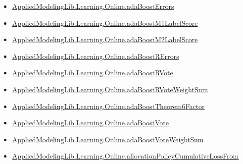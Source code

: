 \documentclass[10pt]{article}
\begin{document}
\begin{itemize}[leftmargin=1.2em]
\begin{itemize}[leftmargin=1.2em]
\item \hyperlink{library-prerequisite-ff1cefb5582d918e}{Applied\allowbreak{}Modeling\allowbreak{}Lib.\allowbreak{}Learning.\allowbreak{}Online.\allowbreak{}ada\allowbreak{}Boost\allowbreak{}Errors}
\item \hyperlink{library-prerequisite-3e4d395ab09bf43b}{Applied\allowbreak{}Modeling\allowbreak{}Lib.\allowbreak{}Learning.\allowbreak{}Online.\allowbreak{}ada\allowbreak{}Boost\allowbreak{}M1\allowbreak{}Label\allowbreak{}Score}
\item \hyperlink{library-prerequisite-69e0e550b668ec14}{Applied\allowbreak{}Modeling\allowbreak{}Lib.\allowbreak{}Learning.\allowbreak{}Online.\allowbreak{}ada\allowbreak{}Boost\allowbreak{}M2\allowbreak{}Label\allowbreak{}Score}
\item \hyperlink{library-prerequisite-9acc9d26d6df8637}{Applied\allowbreak{}Modeling\allowbreak{}Lib.\allowbreak{}Learning.\allowbreak{}Online.\allowbreak{}ada\allowbreak{}Boost\allowbreak{}R\allowbreak{}Errors}
\item \hyperlink{library-prerequisite-e236e0a8a294e6f8}{Applied\allowbreak{}Modeling\allowbreak{}Lib.\allowbreak{}Learning.\allowbreak{}Online.\allowbreak{}ada\allowbreak{}Boost\allowbreak{}R\allowbreak{}Vote}
\item \hyperlink{library-prerequisite-80be5e35b2683e28}{Applied\allowbreak{}Modeling\allowbreak{}Lib.\allowbreak{}Learning.\allowbreak{}Online.\allowbreak{}ada\allowbreak{}Boost\allowbreak{}R\allowbreak{}Vote\allowbreak{}Weight\allowbreak{}Sum}
\item \hyperlink{library-prerequisite-86f06e91fc897699}{Applied\allowbreak{}Modeling\allowbreak{}Lib.\allowbreak{}Learning.\allowbreak{}Online.\allowbreak{}ada\allowbreak{}Boost\allowbreak{}Theorem6\allowbreak{}Factor}
\item \hyperlink{library-prerequisite-92cfcae91fb844cf}{Applied\allowbreak{}Modeling\allowbreak{}Lib.\allowbreak{}Learning.\allowbreak{}Online.\allowbreak{}ada\allowbreak{}Boost\allowbreak{}Vote}
\item \hyperlink{library-prerequisite-864e76243c68eb36}{Applied\allowbreak{}Modeling\allowbreak{}Lib.\allowbreak{}Learning.\allowbreak{}Online.\allowbreak{}ada\allowbreak{}Boost\allowbreak{}Vote\allowbreak{}Weight\allowbreak{}Sum}
\item \hyperlink{library-prerequisite-05e48fe76bbea3d6}{Applied\allowbreak{}Modeling\allowbreak{}Lib.\allowbreak{}Learning.\allowbreak{}Online.\allowbreak{}allocation\allowbreak{}Policy\allowbreak{}Cumulative\allowbreak{}Loss\allowbreak{}From}

\end{itemize}
\end{itemize}
\end{document}
